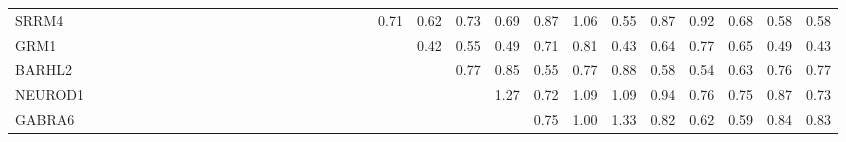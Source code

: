 \begin{longtable}{lrrrrrrrrrrrrrrrrrrrrrrrrrrrrrrrr}
SRRM4         &             &             &            &              &               &                &            &                &             &             &             &             &                    &             &              &               &            &             &              &             &       0.71 &         0.62 &          0.73 &         0.69 &         0.87 &       1.06 &           0.55 &          0.87 &                0.92 &       0.68 &         0.58 &      0.58 \\
GRM1          &             &             &            &              &               &                &            &                &             &             &             &             &                    &             &              &               &            &             &              &             &            &         0.42 &          0.55 &         0.49 &         0.71 &       0.81 &           0.43 &          0.64 &                0.77 &       0.65 &         0.49 &      0.43 \\
BARHL2        &             &             &            &              &               &                &            &                &             &             &             &             &                    &             &              &               &            &             &              &             &            &              &          0.77 &         0.85 &         0.55 &       0.77 &           0.88 &          0.58 &                0.54 &       0.63 &         0.76 &      0.77 \\
NEUROD1       &             &             &            &              &               &                &            &                &             &             &             &             &                    &             &              &               &            &             &              &             &            &              &               &         1.27 &         0.72 &       1.09 &           1.09 &          0.94 &                0.76 &       0.75 &         0.87 &      0.73 \\
GABRA6        &             &             &            &              &               &                &            &                &             &             &             &             &                    &             &              &               &            &             &              &             &            &              &               &              &         0.75 &       1.00 &           1.33 &          0.82 &                0.62 &       0.59 &         0.84 &      0.83 \\

\end{longtable}
